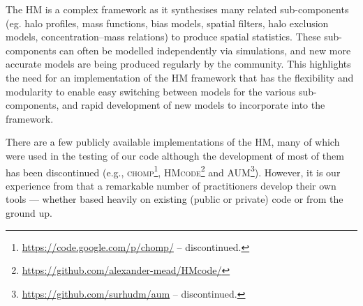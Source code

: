 \documentclass[5p,aas_macros]{elsarticle}
\newcommand{\bd}[1]{\textcolor{purple}{\textbf{[BD: #1]}}}
\begin{document}
The HM is a complex framework as it synthesises many related sub-components (eg. halo profiles, mass functions, bias models, spatial filters, halo exclusion models, concen\-tration--mass relations) to produce spatial statistics. 
These sub-components can often be modelled independently via simulations, and new more accurate models are being produced regularly by the community. 
This highlights the need for an implementation of the HM framework that has the flexibility and modularity to enable easy switching between models for the various sub-components, and rapid development of new models to incorporate into the framework.


There are a few publicly available implementations of the HM, many of which were used in the testing of our code although the development of most of them has been discontinued (e.g., \textsc{chomp}\footnote{\url{https://code.google.com/p/chomp/}  -- discontinued.}, \textsc{HMcode}\footnote{\url{https://github.com/alexander-mead/HMcode/}} and \textsc{AUM}\footnote{\url{https://github.com/surhudm/aum} -- discontinued.}).
However, it is our experience from that a remarkable number of 
practitioners develop their own tools --- whether based heavily on existing (public or private) code or from the ground up. 
\end{document}
